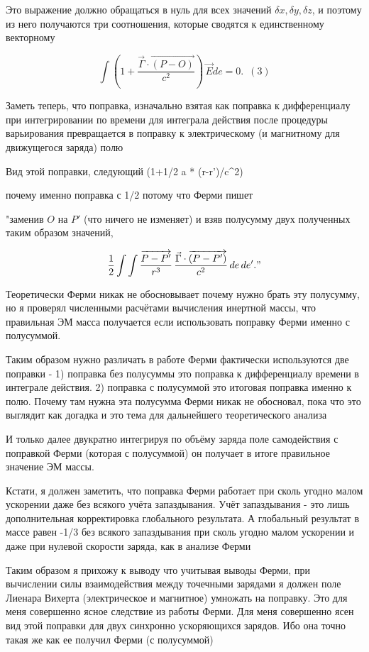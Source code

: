 \documentclass[11pt]{article}
\begin{document}
Это выражение должно обращаться в нуль для всех значений
\(\delta x, \delta y, \delta z\), и поэтому из него получаются три
соотношения, которые сводятся к единственному векторному

\[\int \left (1 + \frac{\vec {\Gamma} \cdot \overrightarrow{\left(P - O\right)}}{c^2}\right)\, \vec E de = 0.\,\,\,(3)\]

Заметь теперь, что поправка, изначально взятая как поправка к
дифференциалу при интегрировании по времени для интеграла действия после
процедуры варьирования превращается в поправку к электрическому (и
магнитному для движущегося заряда) полю

Вид этой поправки, следующий (1+1/2 a * (r-r')/c\^{}2)

почему именно поправка с 1/2 потому что Ферми пишет

"заменив \(O\) на \(P'\) (что ничего не изменяет) и взяв полусумму двух
полученных таким образом значений,

\[\frac{1}{2} \int \int\frac{\overrightarrow{P-P'}}{r^3} \, \frac{\vec {\Gamma} \cdot \overrightarrow{\left(P - P'\right)}}{c^2} \, de\,de'."\]

Теоретически Ферми никак не обосновывает почему нужно брать эту
полусумму, но я проверял численными расчётами вычисления инертной массы,
что правильная ЭМ масса получается если использовать поправку Ферми
именно с полусуммой.

Таким образом нужно различать в работе Ферми фактически используются две
поправки - 1) поправка без полусуммы это поправка к дифференциалу
времени в интеграле действия. 2) поправка с полусуммой это итоговая
поправка именно к полю. Почему там нужна эта полусумма Ферми никак не
обосновал, пока что это выглядит как догадка и это тема для дальнейшего
теоретического анализа

И только далее двукратно интегрируя по объёму заряда поле самодействия с
поправкой Ферми (которая с полусуммой) он получает в итоге правильное
значение ЭМ массы.

Кстати, я должен заметить, что поправка Ферми работает при сколь угодно
малом ускорении даже без всякого учёта запаздывания. Учёт запаздывания -
это лишь дополнительная корректировка глобального результата. А
глобальный результат в массе равен -1/3 без всякого запаздывания при
сколь угодно малом ускорении и даже при нулевой скорости заряда, как в
анализе Ферми

Таким образом я прихожу к выводу что учитывая выводы Ферми, при
вычислении силы взаимодействия между точечными зарядами я должен поле
Лиенара Вихерта (электрическое и магнитное) умножать на поправку. Это
для меня совершенно ясное следствие из работы Ферми. Для меня совершенно
ясен вид этой поправки для двух синхронно ускоряющихся зарядов. Ибо она
точно такая же как ее получил Ферми (с полусуммой)
\end{document}
